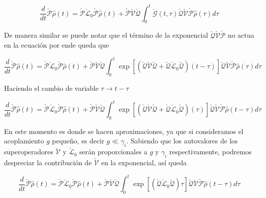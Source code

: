 \begin{appendixs}
\begin{equation*}
    \frac{d}{dt}\check{\mathcal{P}}\hat{\rho}(t) = \check{\mathcal{P}}\check{\mathcal{L}}_{0}\check{\mathcal{P}}\hat{\rho}(t) + \check{\mathcal{P}}\check{\mathcal{V}}\check{\mathcal{Q}}\int_{0}^{t}\check{\mathcal{G}}(t,\tau)\check{\mathcal{Q}}\check{\mathcal{V}} \check{\mathcal{P}}\hat{\rho}(\tau)d\tau        
\end{equation*}

De manera similar se puede notar que el término de la exponencial $\check{\mathcal{Q}}\check{\mathcal{V}}\check{\mathcal{P}}$ no actua en la ecuación por ende queda que 

\begin{equation*}
    \frac{d}{dt}\check{\mathcal{P}}\hat{\rho}(t) = \check{\mathcal{P}}\check{\mathcal{L}}_{0}\check{\mathcal{P}}\hat{\rho}(t) + \check{\mathcal{P}}\check{\mathcal{V}}\check{\mathcal{Q}}\int_{0}^{t}\exp \left[\left(\check{\mathcal{Q}}\check{\mathcal{V}}\check{\mathcal{Q}} + \check{\mathcal{Q}}\check{\mathcal{L}}_{0}\check{\mathcal{Q}}\right) (t-\tau) \right]\check{\mathcal{Q}}\check{\mathcal{V}} \check{\mathcal{P}}\hat{\rho}(\tau)d\tau        
\end{equation*}

Haciendo el cambio de variable $\tau \to t-\tau$

\begin{equation*}
    \frac{d}{dt}\check{\mathcal{P}}\hat{\rho}(t) = \check{\mathcal{P}}\check{\mathcal{L}}_{0}\check{\mathcal{P}}\hat{\rho}(t) + \check{\mathcal{P}}\check{\mathcal{V}}\check{\mathcal{Q}}\int_{0}^{t}\exp \left[\left(\check{\mathcal{Q}}\check{\mathcal{V}}\check{\mathcal{Q}} + \check{\mathcal{Q}}\check{\mathcal{L}}_{0}\check{\mathcal{Q}}\right) (\tau) \right]\check{\mathcal{Q}}\check{\mathcal{V}} \check{\mathcal{P}}\hat{\rho}(t-\tau)d\tau        
\end{equation*}

En este momento es donde se hacen aproximaciones, ya que si consideramos el acoplamiento $g$ pequeño, es decir $g \ll \gamma_{i}$. Sabiendo que los autovalores de los superoperadores $\check{\mathcal{V}}$ y $\check{\mathcal{L}}_{0}$ serán proporcionales a $g$ y $\gamma_{i}$ respectivamente,  podremos despreciar la contribución de $\check{\mathcal{V}}$ en la exponencial, así queda

\begin{equation*}
    \frac{d}{dt}\check{\mathcal{P}}\hat{\rho}(t) = \check{\mathcal{P}}\check{\mathcal{L}}_{0}\check{\mathcal{P}}\hat{\rho}(t) + \check{\mathcal{P}}\check{\mathcal{V}}\check{\mathcal{Q}}\int_{0}^{t}\exp \left[\left( \check{\mathcal{Q}}\check{\mathcal{L}}_{0}\check{\mathcal{Q}}\right)\tau \right]\check{\mathcal{Q}}\check{\mathcal{V}} \check{\mathcal{P}}\hat{\rho}(t-\tau)d\tau        
\end{equation*}


\end{appendixs}
